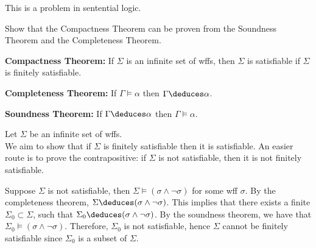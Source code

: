 \begin{problem}
  This is a problem in sentential logic.

  \step
  Show that the Compactness Theorem can be proven from 
  the Soundness Theorem and the Completeness Theorem.

  \step
  \textbf{Compactness Theorem:} If $\Sigma$ is an infinite set of wffs,
  then $\Sigma$ is satisfiable if $\Sigma$ is finitely satisfiable.

  \step
  \textbf{Completeness Theorem:} If $\Gamma \models \alpha$ then $\Gamma \deduces \alpha$.

  \step
  \textbf{Soundness Theorem:} If $\Gamma \deduces \alpha$ then $\Gamma \models \alpha$. 
\end{problem}
\begin{Answer}
  Let $\Sigma$ be an infinite set of wffs.\\
  We aim to show that if $\Sigma$ is finitely satisfiable then it is satisfiable.
  An easier route is to prove the contrapositive: if $\Sigma$ is not satisfiable,
  then it is not finitely satisfiable.

  \step
  Suppose $\Sigma$ is not satisfiable, then $\Sigma \models (\sigma \land \lnot \sigma)$
  for some wff $\sigma$. By the completeness theorem, $\Sigma \deduces (\sigma \land \lnot \sigma)$.
  This implies that there exists a finite
  $\Sigma_0 \subset \Sigma$, such that $\Sigma_0 \deduces (\sigma \land \lnot \sigma)$.
  By the soundness theorem, we have that $\Sigma_0 \models (\sigma \land \lnot \sigma)$.
  Therefore, $\Sigma_0$ is not satisfiable, hence $\Sigma$ cannot be finitely satisfiable
  since $\Sigma_0$ is a subset of $\Sigma$.
\end{Answer}
